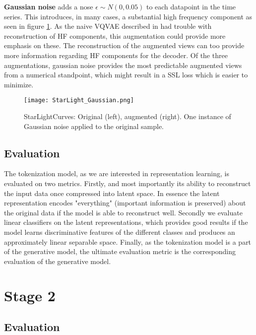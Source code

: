 \documentclass[../../thesis.tex]{subfiles}
\begin{document}
\textbf{Gaussian noise} adds a nose $\epsilon \sim N(0,0.05)$ to each datapoint in the time series. This introduces, in many cases, a substantial high frequency component as seen in figure \ref{fig:StarLight_Gaussian}. As the naive VQVAE described in \cite{TimeVQVAE} had trouble with reconstruction of HF components, this augmentation could provide more emphasis on these. The reconstruction of the augmented views can too provide more information regarding HF components for the decoder. Of the three augmentations, gaussian noise provides the most predictable augmented views from a numerical standpoint, which might result in a SSL loss which is easier to minimize.

\begin{figure}[h]
    \texttt{[image: StarLight\_Gaussian.png]}
    \centering
    \caption{StarLightCurves: Original (left), augmented (right). One instance of Gaussian noise applied to the original sample.}
    \label{fig:StarLight_Gaussian}
\end{figure}

\subsection{Evaluation}

The tokenization model, as we are interested in representation learning, is evaluated on two metrics. Firstly, and most importantly its ability to reconstruct the input data once compressed into latent space. In essence the latent representation encodes "everything" (important information is preserved) about the original data if the model is able to reconstruct well. Secondly we evaluate linear classifiers on the latent representations, which provides good results if the model learns discriminative features of the different classes and produces an approximately linear separable space. Finally, as the tokenization model is a part of the generative model, the ultimate evaluation metric is the corresponding evaluation of the generative model. 



\section{Stage 2}

\subsection{Evaluation}
\end{document}
